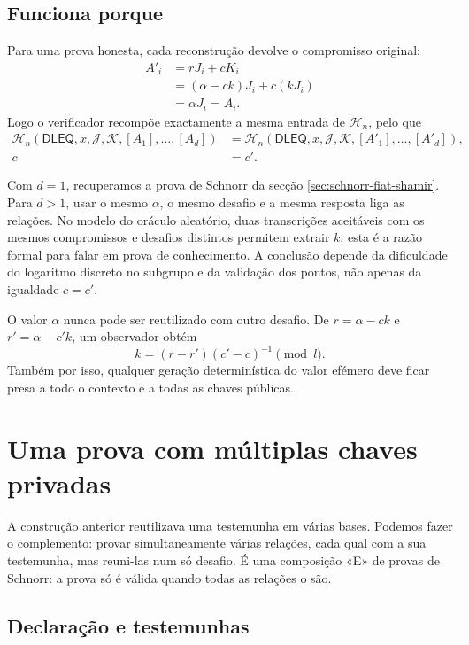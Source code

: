 \subsection*{Funciona porque}

Para uma prova honesta, cada reconstrução devolve o compromisso original:
\begin{align*}
A'_i
  &=rJ_i+cK_i\\
  &=(\alpha-ck)J_i+c(kJ_i)\\
  &=\alpha J_i=A_i.
\end{align*}
Logo o verificador recompõe exactamente a mesma entrada de
\(\mathcal H_n\), pelo que
\begin{align*}
\mathcal H_n(\mathsf{DLEQ},x,\mathcal J,\mathcal K,
 [A_1],\ldots,[A_d])
&=\mathcal H_n(\mathsf{DLEQ},x,\mathcal J,\mathcal K,
 [A'_1],\ldots,[A'_d]),\\
c&=c'.
\end{align*}

Com \(d=1\), recuperamos a prova de Schnorr da secção
\ref{sec:schnorr-fiat-shamir}. Para \(d>1\), usar o mesmo \(\alpha\), o mesmo
desafio e a mesma resposta liga as relações. No modelo do oráculo aleatório,
duas transcrições aceitáveis com os mesmos compromissos e desafios distintos
permitem extrair \(k\); esta é a razão formal para falar em prova de
conhecimento. A conclusão depende da dificuldade do logaritmo discreto no
subgrupo e da validação dos pontos, não apenas da igualdade \(c=c'\).

O valor \(\alpha\) nunca pode ser reutilizado com outro desafio. De
\(r=\alpha-ck\) e \(r'=\alpha-c'k\), um observador obtém
\[
k=(r-r')(c'-c)^{-1}\pmod l.
\]
Também por isso, qualquer geração determinística do valor efémero deve ficar
presa a todo o contexto e a todas as chaves públicas.

\section{Uma prova com múltiplas chaves privadas}
\label{sec:multiple_private_keys_in_one_proof}

A construção anterior reutilizava uma testemunha em várias bases. Podemos
fazer o complemento: provar simultaneamente várias relações, cada qual com a
sua testemunha, mas reuni-las num só desafio. É uma composição «E» de
provas de Schnorr: a prova só é válida quando todas as relações o são.

\subsection*{Declaração e testemunhas}

